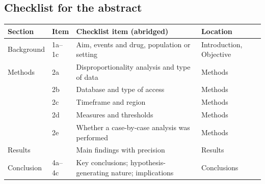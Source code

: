 \documentclass[10pt]{article}
\begin{document}
\subsection*{Checklist for the abstract}
\begin{longtable}{@{}>{\raggedright\arraybackslash}p{2.6cm}>{\raggedright\arraybackslash}p{0.8cm}>{\raggedright\arraybackslash}p{8.4cm}>{\raggedright\arraybackslash}p{3.4cm}@{}}
\toprule
Section & Item & Checklist item (abridged) & Location \\
\midrule
\endhead
\bottomrule
\endfoot
Background & 1a--1c & Aim, events and drug, population or setting & Introduction, Objective \\
Methods & 2a & Disproportionality analysis and type of data & Methods \\
 & 2b & Database and type of access & Methods \\
 & 2c & Timeframe and region & Methods \\
 & 2d & Measures and thresholds & Methods \\
 & 2e & Whether a case-by-case analysis was performed & Methods \\
Results & 3 & Main findings with precision & Results \\
Conclusion & 4a--4c & Key conclusions; hypothesis-generating nature; implications & Conclusions \\
\end{longtable}



\end{document}
